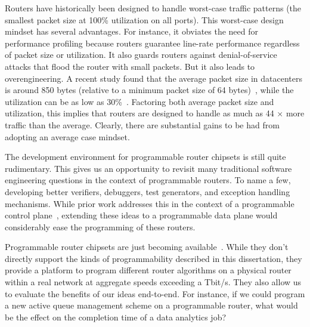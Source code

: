  Routers have historically been
designed to handle worst-case traffic patterns (\ie the smallest packet size at
100\% utilization on all ports). This worst-case design mindset has several
advantages. For instance, it obviates the need for performance profiling
because routers guarantee line-rate performance regardless of packet size or
utilization. It also guards routers against denial-of-service attacks that flood
the router with small packets. But it also leads to overengineering. A recent
study found that the average packet size in datacenters is around 850 bytes
(relative to a minimum packet size of 64 bytes)~\cite{theo_dc}, while the
utilization can be as low as 30\%~\cite{theo_dc}. Factoring both average packet
size and utilization, this implies that routers are designed to handle as much
as 44 $\times$ more traffic than the average. Clearly, there are substantial
gains to be had from adopting an average case mindset.

The development environment for programmable router chipsets is still quite
rudimentary. This gives us an opportunity to revisit many traditional software
engineering questions in the context of programmable routers. To name a few,
developing better verifiers, debuggers, test generators, and exception handling
mechanisms. While prior work addresses this in the context of a programmable
control plane~\cite{test_gen, hsa}, extending these ideas to a programmable
data plane would considerably ease the programming of these routers.

Programmable router chipsets are just becoming available~\cite{tofino}. While
they don't directly support the kinds of programmability described in this
dissertation, they provide a platform to program different router algorithms on
a physical router within a real network at aggregate speeds exceeding a Tbit/s.
They also allow us to evaluate the benefits of our ideas end-to-end. For
instance, if we could program a new active queue management scheme on a
programmable router, what would be the effect on the completion time of a
data analytics job?

